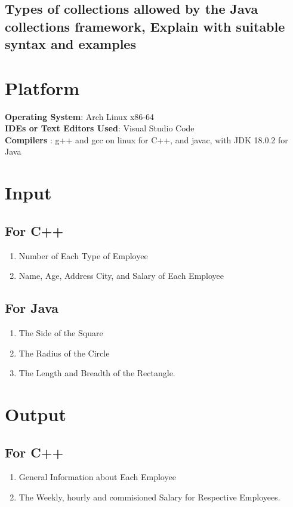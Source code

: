 \documentclass[11pt]{article}
\begin{document}
\subsection{Types of collections allowed by the Java collections framework, Explain with suitable syntax and examples}

\section{Platform}
\textbf{Operating System}: Arch Linux x86-64 \\
\textbf{IDEs or Text Editors Used}: Visual Studio Code\\
\textbf{Compilers} : g++ and gcc on linux for C++, and javac, with JDK 18.0.2 for Java\\

\section{Input}

\subsection*{For C++}
\begin{enumerate}
	\item Number of Each Type of Employee
	\item Name, Age, Address City, and Salary of Each Employee
\end{enumerate}

\subsection*{For Java}
\begin{enumerate}
	\item The Side of the Square
	\item The Radius of the Circle
	\item The Length and Breadth of the Rectangle.
\end{enumerate}

\section{Output}
\subsection*{For C++}
\begin{enumerate}
	\item General Information about Each Employee
	\item The Weekly, hourly and commisioned Salary for Respective Employees.
\end{enumerate}
\end{document}
